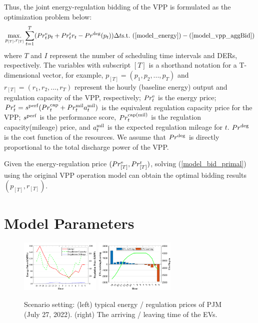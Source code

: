 \documentclass[conference,a4paper]{IEEEtran}
\begin{document}
 Thus, the joint energy-regulation bidding of the VPP is formulated as the optimization problem below:
\begin{subequations}\label{model_bid_primal}
\begin{equation}\label{model_vpp_profit}
    \underset{p_{[T]}, r_{[T]}}{\rm max.} \sum_{t=1}^{T}(Pr^{\rm e}_{t} p_{t} + Pr^{\rm r}_{t} r_{t} 
    - Pr^{\rm deg}(p_{t}))\Delta t
\end{equation}\vspace{-0ex}
\begin{equation}\label{model_vpp_constraint}
  {\rm s.t.} \ (\ref{model_energy})-(\ref{model_vpp_aggBid})
\end{equation}
\end{subequations}
where $T$ and $I$ represent the number of scheduling time intervals and DERs, respectively. The variables with subscript $[T]$ is a shorthand notation for a T-dimensional vector, for example, $p_{[T]} = (p_1, p_2, ..., p_T)$ and $r_{[T]} = (r_1, r_2, ..., r_T)$ represent the hourly (baseline energy) output and regulation capacity of the VPP, respectively; $Pr^{\rm e}_{t}$ is the energy price; $Pr^{\rm r}_{t} = s^{\rm perf} (Pr^{\rm cap}_{t} + Pr^{\rm mil}_{t} a^{\rm mil}_{t})$ is the equivalent regulation capacity price for the VPP; $s^{\rm perf}$ is the performance score, $Pr^{\rm cap(mil)}_{t}$ is the regulation capacity(mileage) price, and $a^{\rm mil}_{t}$ is the expected regulation mileage for $t$. $Pr^{\rm deg}$ is the cost function of the resources. We assume that $Pr^{\rm deg}$ is directly proportional to the total discharge power of the VPP.

Given the energy-regulation price $(Pr^{\rm e}_{[T]}, Pr^{\rm r}_{[T]})$, solving (\ref{model_bid_primal}) using the original VPP operation model can obtain the optimal bidding results $(p_{[T]}, r_{[T]})$.


\section{Model Parameters}\label{sec_numerical}

\begin{figure}[!t]
  \centering
    \includegraphics[width=1.5in]{figures/price.pdf}
    \includegraphics[width=1.5in]{figures/ev_arrive_leave.pdf}
\caption{Scenario setting: (left) typical energy / regulation prices of PJM (July 27, 2022). (right) The arriving / leaving time of the EVs.}
  \label{fig_scenario}
\end{figure}
\end{document}
